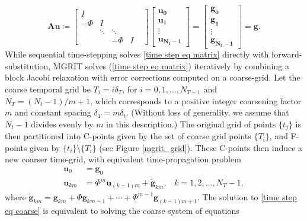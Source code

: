 \documentclass[VANCOUVER,STIX1COL]{WileyNJD-v2}
\begin{document}
\begin{equation}\label{time step eq matrix}
\mathbf{Au} \coloneqq 
\begin{bmatrix} 
I &  &  &  & \\
-\Phi & I &  &  &\\
& \ddots &  \ddots&  & \\
& & -\Phi & I
\end{bmatrix}
\begin{bmatrix}
\mathbf{u_0}\\ \mathbf{u_1} \\ \vdots \\ \mathbf{u_{N_t-1}}
\end{bmatrix}=
\begin{bmatrix}
\mathbf{g_0}\\ \mathbf{g_1} \\ \vdots \\ \mathbf{g_{N_t-1}}
\end{bmatrix} = \mathbf{g}.
\end{equation}
While sequential time-stepping solves \eqref{time step eq matrix} directly with forward-substitution, MGRIT solves (\ref{time step eq matrix}) iteratively by combining a block Jacobi relaxation with error corrections computed on a coarse-grid. Let the coarse temporal grid be $T_i = i \delta_T$, for $i=0,1,...,N_{T-1}$ and $N_T = (N_t-1)/m+1$, which corresponds to a positive integer coarsening factor $m$ and constant spacing $\delta_T = m \delta_t$. (Without loss of generality, we assume that $N_t-1$ divides evenly by $m$ in this description.) The original grid of points $\{t_j\}$ is then partitioned into C-points given by the set of coarse grid points $\{T_i\}$, and F-points given by $\{t_i\} \setminus \{T_i\}$ (see Figure \ref{mgrit_grid}). These C-points then induce a new coarser time-grid, with equivalent time-propagation problem
\begin{equation}\label{time step eq coarse}
\begin{aligned}
\mathbf{u}_0 &= \mathbf{g}_0 \\
\mathbf{u}_{km} &= \Phi^m \mathbf{u}_{(k-1)m} + \tilde{\mathbf{g}}_{km}, \hspace{10pt} k=1,2,...,N_T-1,
\end{aligned}
\end{equation}
where $\tilde{\mathbf{g}}_{km} = \mathbf{g}_{km} + \Phi \mathbf{g}_{km-1} + \cdots + \Phi^{m-1} \mathbf{g}_{(k-1)m+1}$.
The solution to \eqref{time step eq coarse} is equivalent to solving the coarse system of equations
\end{document}
